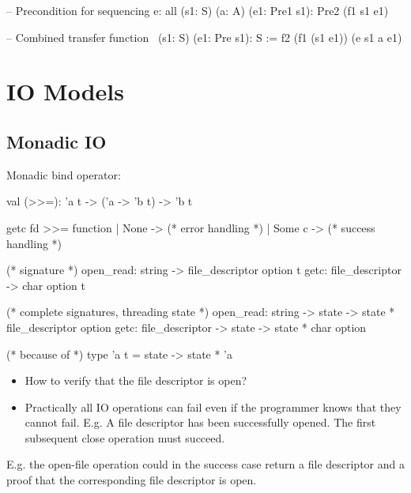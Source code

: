 \begin{alba}
    -- Precondition for sequencing
    e: all (s1: S) (a: A) (e1: Pre1 s1): Pre2 (f1 s1 e1)

    -- Combined transfer function
    \ (s1: S) (e1: Pre s1): S :=
        f2 (f1 (s1 e1)) (e s1 a e1)
\end{alba}





\section{IO Models}



\subsection{Monadic IO}

\noindent Monadic bind operator:
\begin{ocaml}
  val (>>=): 'a t -> ('a -> 'b t) -> 'b t
\end{ocaml}


\begin{ocaml}
  getc fd >>= function
  | None ->
    (* error handling *)
  | Some c ->
    (* success handling *)

  (* signature *)
  open_read: string -> file_descriptor option t
  getc: file_descriptor -> char option t

  (* complete signatures, threading state *)
  open_read: string -> state -> state * file_descriptor option
  getc: file_descriptor -> state -> state * char option

  (* because of *)
  type 'a t = state -> state * 'a
\end{ocaml}
%

\begin{itemize}
\item How to verify that the file descriptor is open?


\item Practically all IO operations can fail even if the programmer knows that
  they cannot fail. E.g. A file descriptor has been successfully opened. The
  first subsequent close operation must succeed.

\end{itemize}


E.g. the open-file operation could in the success case return a file
descriptor and a proof that the corresponding file descriptor is open.







